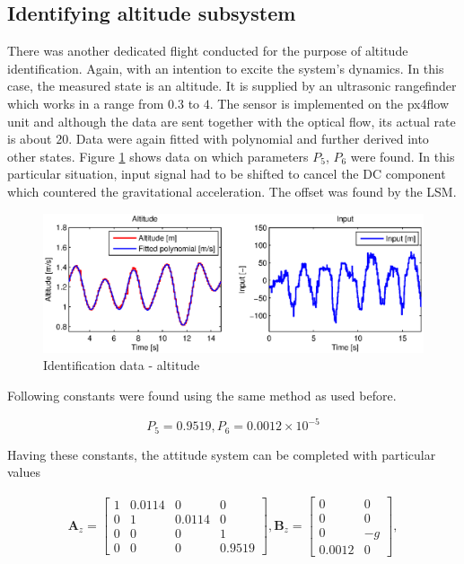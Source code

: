 \subsection{Identifying altitude subsystem}

There was another dedicated flight conducted for the purpose of altitude identification. Again, with an intention to excite the system's dynamics. In this case, the measured state is an altitude. It is supplied by an ultrasonic rangefinder which works in a range from $0.3$ to $4$. The sensor is implemented on the px4flow unit and although the data are sent together with the optical flow, its actual rate is about $20$. Data were again fitted with polynomial and further derived into other states. Figure \ref{fig:iden3} shows data on which parameters $P_5$, $P_6$ were found. In this particular situation, input signal had to be shifted to cancel the DC component which countered the gravitational acceleration. The offset was found by the LSM.

\begin{figure}[h]
\includegraphics[width=1\textwidth]{fig/iden3.eps} 
\caption{Identification data - altitude}
\label{fig:iden3}
\end{figure}

Following constants were found using the same method as used before. 

\begin{equation}
P_5 = 0.9519, P_6 = 0.0012 \times 10^{-5} 
\label{eq:constants1}
\end{equation}

Having these constants, the attitude system can be completed with particular values

\begin{equation}
\begin{split}
\mathbf{A}_{z} = \begin{bmatrix}
1 & 0.0114 & 0 & 0\\
0 & 1 & 0.0114 & 0\\
0 & 0 & 0 & 1 \\
0 & 0 & 0 & 0.9519
\end{bmatrix}, \mathbf{B}_{z} = \begin{bmatrix}
0 & 0\\
0 & 0\\
0 & -g\\
0.0012 & 0
\end{bmatrix},
\end{split}
\label{eq:altitude_LTI}
\end{equation}

